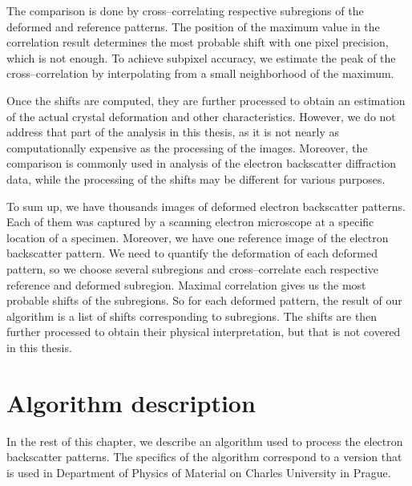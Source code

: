 The comparison is done by cross--correlating respective subregions of the deformed and reference patterns. The position of the maximum value in the correlation result determines the most probable shift with one pixel precision, which is not enough. To achieve subpixel accuracy, we estimate the peak of the cross--correlation by interpolating from a small neighborhood of the maximum.

Once the shifts are computed, they are further processed to obtain an estimation of the actual crystal deformation and other characteristics. However, we do not address that part of the analysis in this thesis, as it is not nearly as computationally expensive as the processing of the images. Moreover, the comparison is commonly used in analysis of the electron backscatter diffraction data, while the processing of the shifts may be different for various purposes.

To sum up, we have thousands images of deformed electron backscatter patterns. Each of them was captured by a scanning electron microscope at a specific location of a specimen. Moreover, we have one reference image of the electron backscatter pattern. We need to quantify the deformation of each deformed pattern, so we choose several subregions and cross--correlate each respective reference and deformed subregion. Maximal correlation gives us the most probable shifts of the subregions. So for each deformed pattern, the result of our algorithm is a list of shifts corresponding to subregions. The shifts are then further processed to obtain their physical interpretation, but that is not covered in this thesis.


\section{Algorithm description}

In the rest of this chapter, we describe an algorithm used to process the electron backscatter patterns. The specifics of the algorithm correspond to a version that is used in Department of Physics of Material on Charles University in Prague. 

